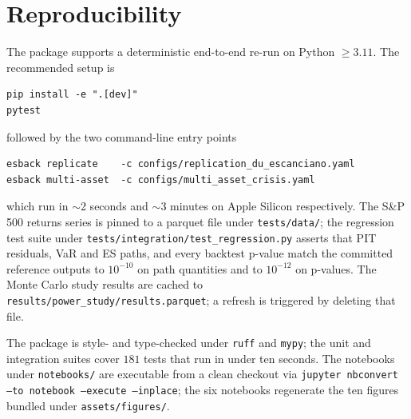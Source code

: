 \documentclass[11pt,a4paper]{article}
\newcommand{\code}[1]{\texttt{\small #1}}
\newcommand{\package}[1]{\texttt{#1}}
\theoremstyle{plain}
\begin{document}
\section{Reproducibility}
\label{app:reproducibility}

The package supports a deterministic end-to-end re-run on Python
$\geq 3.11$. The recommended setup is
\begin{verbatim}
pip install -e ".[dev]"
pytest
\end{verbatim}
followed by the two command-line entry points
\begin{verbatim}
esback replicate    -c configs/replication_du_escanciano.yaml
esback multi-asset  -c configs/multi_asset_crisis.yaml
\end{verbatim}
which run in $\sim$2 seconds and $\sim$3 minutes on Apple Silicon
respectively. The S\&P 500 returns series is pinned to a parquet file
under \code{tests/data/}; the regression test suite under
\code{tests/integration/test\_regression.py} asserts that PIT
residuals, VaR and ES paths, and every backtest p-value match the
committed reference outputs to $10^{-10}$ on path quantities and to
$10^{-12}$ on p-values. The Monte Carlo study results are cached to
\code{results/power\_study/results.parquet}; a refresh is triggered
by deleting that file.

The package is style- and type-checked under \package{ruff} and
\package{mypy}; the unit and integration suites cover $181$ tests
that run in under ten seconds. The notebooks under
\code{notebooks/} are executable from a clean checkout via
\code{jupyter nbconvert --to notebook --execute --inplace}; the six
notebooks regenerate the ten figures bundled under
\code{assets/figures/}.
\end{document}
